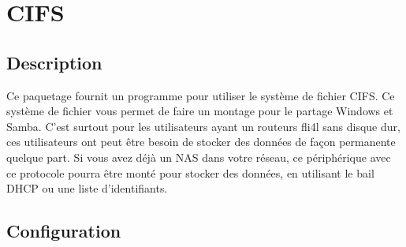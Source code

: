 {
\section {CIFS}
}

\subsection {Description}
  Ce paquetage fournit un programme pour utiliser le système de fichier CIFS.
  Ce système de fichier vous permet de faire un montage pour le partage Windows
  et Samba. C'est surtout pour les utilisateurs ayant un routeurs fli4l sans disque
  dur, ces utilisateurs ont peut être besoin de stocker des données de façon
  permanente quelque part. Si vous avez déjà un NAS dans votre réseau, ce périphérique
  avec ce protocole pourra être monté pour stocker des données, en utilisant le bail
  DHCP ou une liste d'identifiants.

\subsection{Configuration}

